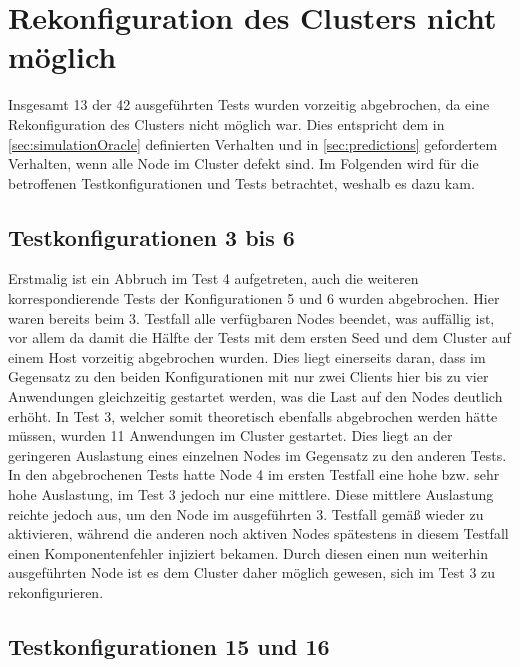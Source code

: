 \section{Rekonfiguration des Clusters nicht möglich}
\label{sec:noReconfig}

Insgesamt 13 der 42 ausgeführten Tests wurden vorzeitig abgebrochen, da eine Rekonfiguration des Clusters nicht möglich war.
Dies entspricht dem in \autoref{sec:simulationOracle} definierten Verhalten und in \autoref{sec:predictions} gefordertem Verhalten, wenn alle Node im Cluster defekt sind.
Im Folgenden wird für die betroffenen Testkonfigurationen und Tests betrachtet, weshalb es dazu kam.

\subsection{Testkonfigurationen 3 bis 6}
\label{sec:noReconf36}

Erstmalig ist ein Abbruch im Test 4 aufgetreten, auch die weiteren korrespondierende Tests der Konfigurationen 5 und 6 wurden abgebrochen.
Hier waren bereits beim 3. Testfall alle verfügbaren Nodes beendet, was auffällig ist, vor allem da damit die Hälfte der Tests mit dem ersten Seed und dem Cluster auf einem Host vorzeitig abgebrochen wurden.
Dies liegt einerseits daran, dass im Gegensatz zu den beiden Konfigurationen mit nur zwei Clients hier bis zu vier Anwendungen gleichzeitig gestartet werden, was die Last auf den Nodes deutlich erhöht.
In Test 3, welcher somit theoretisch ebenfalls abgebrochen werden hätte müssen, wurden 11 Anwendungen im Cluster gestartet.
Dies liegt an der geringeren Auslastung eines einzelnen Nodes im Gegensatz zu den anderen Tests.
In den abgebrochenen Tests hatte Node 4 im ersten Testfall eine hohe bzw. sehr hohe Auslastung, im Test 3 jedoch nur eine mittlere.
Diese mittlere Auslastung reichte jedoch aus, um den Node im ausgeführten 3. Testfall gemäß  wieder zu aktivieren, während die anderen noch aktiven Nodes spätestens in diesem Testfall einen Komponentenfehler injiziert bekamen.
Durch diesen einen nun weiterhin ausgeführten Node ist es dem Cluster daher möglich gewesen, sich im Test 3 zu rekonfigurieren.

\subsection{Testkonfigurationen 15 und 16}
\label{sec:noReconf1516}

